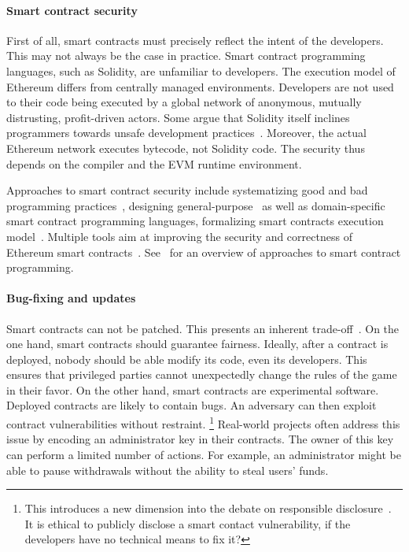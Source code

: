\paragraph{Smart contract security}
First of all, smart contracts must precisely reflect the intent of the developers.
This may not always be the case in practice.
Smart contract programming languages, such as Solidity, are unfamiliar to developers.
The execution model of Ethereum differs from centrally managed environments.
Developers are not used to their code being executed by a global network of anonymous, mutually distrusting, profit-driven actors.
Some argue that Solidity itself inclines programmers towards unsafe development practices~\cite{ydtm2016}.
Moreover, the actual Ethereum network executes bytecode, not Solidity code.
The security thus depends on the compiler and the EVM runtime environment.

Approaches to smart contract security include systematizing good and bad programming practices~\cite{ConsenSys16, Chen2017}, designing general-purpose~\cite{Hirai2017a, Buterin2017b, Pettersson2016} as well as domain-specific~\cite{EgelundMueller2017} smart contract programming languages, formalizing smart contracts execution model~\cite{Sergey2017}.
Multiple tools aim at improving the security and correctness of Ethereum smart contracts~\cite{Bhargavan2016, Luu2016, Hirai2017, Hildenbrandt2018, Tsankov2018}.
See~\cite{Seijas2016} for an overview of approaches to smart contract programming.

\paragraph{Bug-fixing and updates}
Smart contracts can not be patched.
This presents an inherent trade-off~\cite{Porru2017}.
On the one hand, smart contracts should guarantee fairness.
Ideally, after a contract is deployed, nobody should be able modify its code, even its developers.
This ensures that privileged parties cannot unexpectedly change the rules of the game in their favor.
On the other hand, smart contracts are experimental software.
Deployed contracts are likely to contain bugs.
An adversary can then exploit contract vulnerabilities without restraint.
\footnote{This introduces a new dimension into the debate on responsible disclosure~\cite{Schneier2007}. It is ethical to publicly disclose a smart contact vulnerability, if the developers have no technical means to fix it?}
Real-world projects often address this issue by encoding an administrator key in their contracts.
The owner of this key can perform a limited number of actions.
For example, an administrator might be able to pause withdrawals without the ability to steal users' funds.


